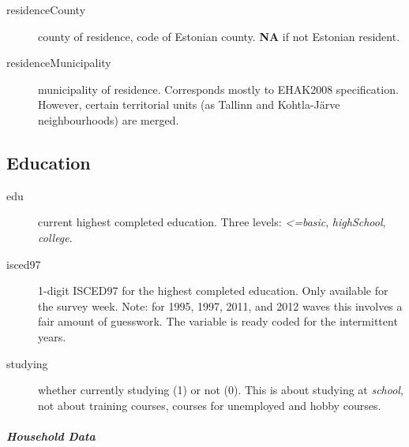 \documentclass[a4paper]{article}
\newcommand{\NA}{\textbf{NA}\xspace}
\begin{document}
\begin{description}
\item[residenceCounty]
  \label{item:residenceCounty} county of residence, code of Estonian
  county.  \NA if not Estonian resident.
\item[residenceMunicipality] municipality of residence.  Corresponds
  mostly to EHAK2008 specification.  However, certain territorial
  units (as Tallinn and Kohtla-Järve neighbourhoods) are merged.
\end{description}

\subsection{Education}
\begin{description}
\item[edu] current highest completed education.  Three levels:
  \emph{<=basic}, \emph{highSchool}, \emph{college}.
\item[isced97] 1-digit ISCED97 for the highest completed education.
  Only available for the survey week.  Note: for 1995, 1997, 2011, and
  2012 waves this involves a fair amount of guesswork.  The variable
  is ready coded for the intermittent years.
\item[studying] whether currently studying (1) or not (0).  This is
  about studying at \emph{school}, not about training courses, courses
  for unemployed and hobby courses.
\end{description}


\subparagraph{Household Data}
\end{document}
